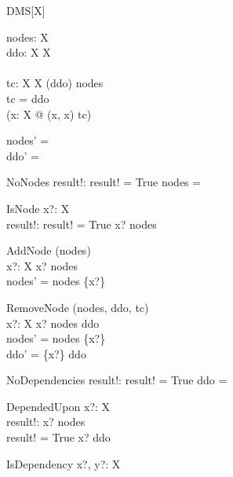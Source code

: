 \zedindent -1mm
\pagestyle{empty}
\raggedbottom

\begin{class}{DMS}[X]
\also
\begin{state}
  nodes: \finset X  \\
  ddo:  X  \rel  X  \\
  \Delta\\
  tc:  X  \rel  X  
\where
  \dom (ddo) \subseteq nodes \land \\ 
  tc = ddo\plus \land \\ 
  \lnot (\exists x:  X @ (x, x) \in tc)
\end{state}
\begin{init}
  nodes' = \emptyset \\ 
  ddo' = \emptyset
\end{init}
\begin{schema}{NoNodes}
  result!:  \bool 
\where
  result! = True \iff nodes = \emptyset \\ 
\end{schema}
\begin{schema}{IsNode}
  x?:  X  \\
  result!:  \bool  
\where
  result! = True \iff x? \in nodes
\end{schema}
\begin{schema}{AddNode}
  \Delta (nodes)\\
  x?:  X  
\where
  x? \notin nodes \\ 
  nodes' = nodes \cup \{x?\}
\end{schema}
\begin{schema}{RemoveNode}
  \Delta (nodes, ddo, tc)\\
  x?:  X  
\where
  x? \in nodes \setminus  \ran ddo \\
  nodes' = nodes \setminus \{x?\} \land \\ 
  ddo' = \{x?\} \ndres ddo
\end{schema}
\begin{schema}{NoDependencies}
  result!:  \bool  
\where
  result! = True \iff ddo = \emptyset
\end{schema}
\begin{schema}{DependedUpon}
  x?:  X  \\
  result!:  \bool  
\where
  x? \in nodes\\
  result! = True \iff x? \in  \ran ddo
\end{schema}
\begin{schema}{IsDependency}
  x?, y?:  X  \\

\end{schema}
\end{class}
